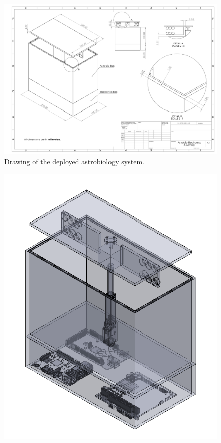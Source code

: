 \begin{centering}
  \begin{figure}[H]
    \includegraphics[width=\textwidth]{Figures/astrobio-electronics.pdf}
    \caption{Drawing of the deployed astrobiology system.}
    \label{fig:astrobio-electronics-drawing}
  \end{figure}
  \begin{figure}[H]
    \includegraphics[width=\textwidth]{Figures/astrobio-electronics-deployed-transparent.png}

\end{figure}
\end{centering}
